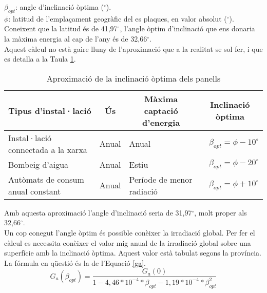 \noindent $\beta_{opt}$: angle d'inclinació òptima ($^\circ$).\\
$\phi$: latitud de l'emplaçament geogràfic del es plaques, en valor absolut ($^\circ$).\\
%
\newline Coneixent que la latitud és de 41,97$^\circ$, l'angle òptim d'inclinació que ens donaria la màxima energia al cap de l'any és de 32,66$^\circ$.\\
\newline Aquest càlcul no està gaire lluny de l'aproximació que a la realitat se sol fer, i que es detalla a la Taula \ref{tab:aprox_angle}.
\begin{table}[H]
  \small
  \centering
    \begin{tabularx} {\textwidth} {|X|l|l|r|} 
 \hline  \multicolumn{1}{|c|}{Tipus d'instal·lació} &  \multicolumn{1}{c|}{Ús} &  \multicolumn{1}{c|}{Màxima captació d'energia} &  \multicolumn{1}{c|}{Inclinació òptima}\\ \hline \hline
Instal·lació connectada a la xarxa & Anual & Anual & $\beta_{opt}=\phi - 10^\circ$ \\ \hline
Bombeig d'aigua & Anual & Estiu & $\beta_{opt}=\phi - 20^\circ$ \\ \hline
Autòmats de consum anual constant & Anual & Període de menor radiació & $\beta_{opt}=\phi + 10^\circ$ \\ \hline

    \end{tabularx}%
\caption{Aproximació de la inclinació òptima dels panells}
\label{tab:aprox_angle}
\end{table}%

\noindent Amb aquesta aproximació l'angle d'inclinació seria de 31,97$^\circ$, molt proper als 32,66$^\circ$.\\
\newline Un cop conegut l'angle òptim és possible conèixer la irradiació global. Per fer el càlcul es necessita conèixer el valor mig anual de la irradiació global sobre una superfície amb la inclinació òptima. Aquest valor està tabulat segons la província.\\
\newline La fórmula en qüestió és la de l'Equació \ref{ga}.
\begin{equation} \label{ga}
G_a(\beta_{opt})= \frac{G_a(0)}{1-4,46*10^{-4}*\beta_{opt}-1,19*10^{-4}*\beta^2_{opt}}
\end{equation}

